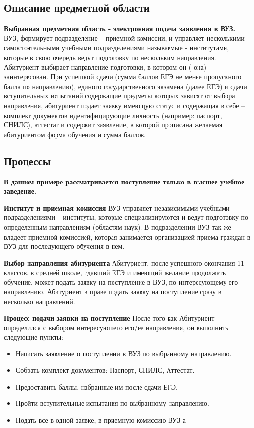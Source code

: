 \documentclass[areasetadvanced]{scrartcl}
\begin{document}
\subsection{Описание предметной области}
\textbf{Выбранная предметная область - электронная подача заявления в ВУЗ.}
ВУЗ, формирует подразделение – приемной комиссии, и управляет несколькими
самостоятельными учебными подразделениями называемые - институтами, которые в свою
очередь ведут подготовку по нескольким направления. Абитуриент выбирает направление
подготовки, в котором он (-она) заинтересован. При успешной сдачи (сумма баллов ЕГЭ не
менее пропускного балла по направлению), единого государственного экзамена (далее ЕГЭ)
и сдачи вступительных испытаний содержащие предметы которых зависят от выбора
направления, абитуриент подает заявку имеющую статус и содержащая в себе – комплект
документов идентифицирующие личность (например: паспорт, СНИЛС), аттестат и
содержит заявление, в которой прописана желаемая абитуриентом форма обучения и сумма
баллов.
\newpage
\subsection{Процессы}
\textbf{В данном примере рассматривается поступление только в высшее учебное заведение.}


\textbf{Институт и приемная комиссия}
ВУЗ управляет независимыми учебными подразделениями – институты, которые
специализируются и ведут подготовку по определенным направлениям (областям наук).
В подразделении ВУЗ так же владеет приемной комиссией, которая занимается организацией
приема граждан в ВУЗ для последующего обучения в нем.

\textbf{Выбор направления абитуриента}
Абитуриент, после успешного окончания 11 классов, в средней школе, сдавший ЕГЭ и
имеющий желание продолжать обучение, может подать заявку на поступление в ВУЗ, по
интересующему его направлению. Абитуриент в праве подать заявку на поступление сразу в
несколько направлений.

\textbf{Процесс подачи заявки на поступление}
После того как Абитуриент определился с выбором интересующего его/ее направления, он
выполнить следующие пункты:
\begin{itemize}
    \item Написать заявление о поступлении в ВУЗ по выбранному направлению.
    \item Собрать комплект документов: Паспорт, СНИЛС, Аттестат.
    \item Предоставить баллы, набранные им после сдачи ЕГЭ.
    \item Пройти вступительные испытания по выбранному направлению.
    \item Подать все в одной заявке, в приемную комиссию ВУЗ-а
\end{itemize}
\end{document}
